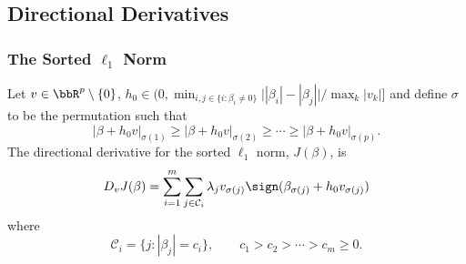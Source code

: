 \subsection{Directional Derivatives}%
\label{sec:directional-derivatives}

\subsubsection{The Sorted \texorpdfstring{\(\ell_1\)}{l1}
  Norm}

\begin{theorem}
  \label{thm:sl1-directional-derivative}
  Let \(v \in \bbR^p \setminus \{0\}\), \(h_0 \in \big(0, \min_{i,j \in
    \{i : \beta_i \neq 0\}}\big| |\beta_i| - |\beta_j| \big|/\max_k|v_k| \big]\) and
  define \(\sigma\) to be the permutation such that
  \[
    |\beta + h_0v|_{\sigma(1)} \geq |\beta + h_0v |_{\sigma(2)}
    \geq \cdots \geq |\beta + h_0v|_{\sigma(p)}.
  \]
  The directional derivative for the sorted \(\ell_1\) norm, \(J(\beta)\), is
  \[
    D_v J(\beta) =
    \sum_{i=1}^m \sum_{j \in \mathcal{C}_i} \lambda_j v_{\sigma(j)}\sign(\beta_{\sigma(j)} + h_0v_{\sigma(j)})\]
  where
  \[
    \mathcal{C}_i = \{j : |\beta_j| = c_i\},\qquad
    c_1 > c_2 > \cdots > c_m \geq 0.
  \]
\end{theorem}

